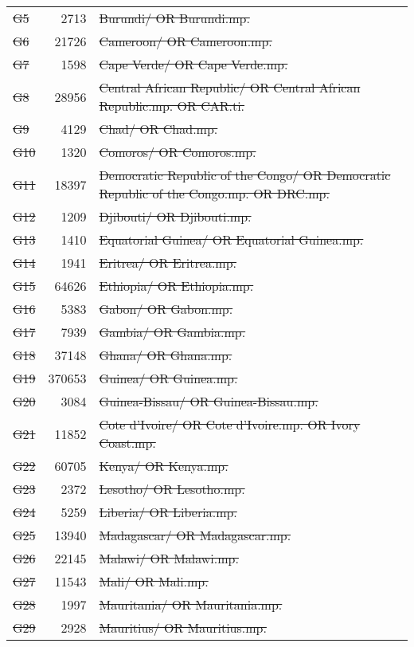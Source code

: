 \begin{longtable}{lrp{}}
   \st{G5} &    \num{2713} & \st{Burundi/ OR Burundi.mp.} \\
   \st{G6} &   \num{21726} & \st{Cameroon/ OR Cameroon.mp.} \\
   \st{G7} &    \num{1598} & \st{Cape Verde/ OR Cape Verde.mp.} \\
   \st{G8} &   \num{28956} & \st{Central African Republic/ OR Central African Republic.mp. OR CAR.ti.} \\
   \st{G9} &    \num{4129} & \st{Chad/ OR Chad.mp.} \\
  \st{G10} &    \num{1320} & \st{Comoros/ OR Comoros.mp.} \\
  \st{G11} &   \num{18397} & \st{Democratic Republic of the Congo/ OR Democratic Republic of the Congo.mp. OR DRC.mp.} \\
  \st{G12} &    \num{1209} & \st{Djibouti/ OR Djibouti.mp.} \\
  \st{G13} &    \num{1410} & \st{Equatorial Guinea/ OR Equatorial Guinea.mp.} \\
  \st{G14} &    \num{1941} & \st{Eritrea/ OR Eritrea.mp.} \\
  \st{G15} &   \num{64626} & \st{Ethiopia/ OR Ethiopia.mp.} \\
  \st{G16} &    \num{5383} & \st{Gabon/ OR Gabon.mp.} \\
  \st{G17} &    \num{7939} & \st{Gambia/ OR Gambia.mp.} \\
  \st{G18} &   \num{37148} & \st{Ghana/ OR Ghana.mp.} \\
  \st{G19} &  \num{370653} & \st{Guinea/ OR Guinea.mp.} \\
  \st{G20} &    \num{3084} & \st{Guinea-Bissau/ OR Guinea-Bissau.mp.} \\
  \st{G21} &   \num{11852} & \st{Cote d'Ivoire/ OR Cote d'Ivoire.mp. OR Ivory Coast.mp.} \\
  \st{G22} &   \num{60705} & \st{Kenya/ OR Kenya.mp.} \\
  \st{G23} &    \num{2372} & \st{Lesotho/ OR Lesotho.mp.} \\
  \st{G24} &    \num{5259} & \st{Liberia/ OR Liberia.mp.} \\
  \st{G25} &   \num{13940} & \st{Madagascar/ OR Madagascar.mp.} \\
  \st{G26} &   \num{22145} & \st{Malawi/ OR Malawi.mp.} \\
  \st{G27} &   \num{11543} & \st{Mali/ OR Mali.mp.} \\
  \st{G28} &    \num{1997} & \st{Mauritania/ OR Mauritania.mp.} \\
  \st{G29} &    \num{2928} & \st{Mauritius/ OR Mauritius.mp.} \\

\end{longtable}
